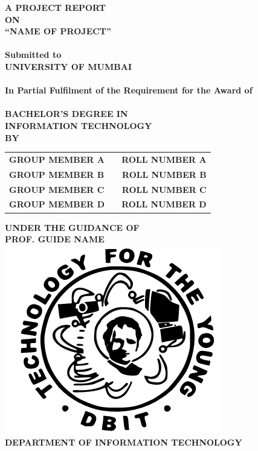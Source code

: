 \newpage
\begin{center}
\thispagestyle{empty}
\Large{\textbf{A PROJECT REPORT\\ON}}\\[0.3cm]
\Large{\textsc {\textbf{``NAME OF PROJECT''}}}\\
\Large{\textbf{\\Submitted to}}
\LARGE{\textbf{\\UNIVERSITY OF MUMBAI\\}}
\large{\textbf{\\In Partial Fulfilment of the Requirement for the Award of\\}}
\LARGE{\textbf{\\BACHELOR'S DEGREE IN\\INFORMATION TECHNOLOGY}}
\vspace{0.3cm}
\Large{\textbf{\\BY}}\\[0.3cm]
\begin{table}[h]
\centering
\Large{
\begin{tabular}{>{\bfseries}lc>{\bfseries}r}
GROUP MEMBER A & & ROLL NUMBER A\\GROUP MEMBER B & & ROLL NUMBER B\\GROUP MEMBER C & & ROLL NUMBER C\\GROUP MEMBER D & & ROLL NUMBER D\\
\end{tabular}}
\end{table}
\large{\textbf{UNDER THE GUIDANCE OF}}\\
\large{\textbf{PROF. GUIDE NAME}}\\[0.5cm]
\includegraphics[scale=0.5]{project/images/jscoe_logo}\\
\large{\textbf{DEPARTMENT OF INFORMATION TECHNOLOGY}}\\

\end{center}
